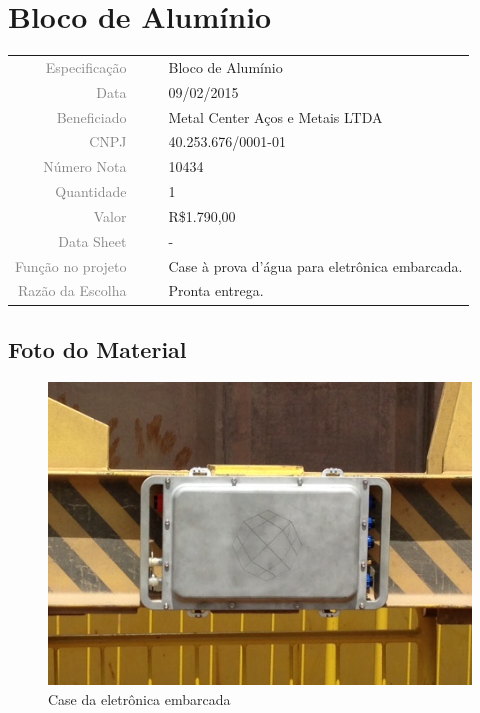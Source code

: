 \section{Bloco de Alumínio}
\label{aluminio_01}


\begin{table}[ht!]

	\begin{tabular}{r l|l p{12cm} }
		
		\textcolor{gray}{Especificação} &&& 	{Bloco de Alumínio}\\
		\textcolor{gray}{Data} &&& 				{09/02/2015}\\
        \textcolor{gray}{Beneficiado} &&&		{Metal Center Aços e Metais LTDA}\\
        \textcolor{gray}{CNPJ} &&& 				{40.253.676/0001-01}\\
        \textcolor{gray}{Número Nota} &&& 		{10434}\\
		\textcolor{gray}{Quantidade} &&& 		{1}\\
		\textcolor{gray}{Valor} &&& 			{R\$1.790,00}\\
		\textcolor{gray}{Data Sheet} &&& 		{-}\\

		\textcolor{gray}{Função no projeto} &&& {Case à prova d'água para eletrônica
		embarcada.}\\
		\textcolor{gray}{Razão da Escolha} &&& {Pronta entrega.}

	\end{tabular}
\end{table}

\newpage
\subsection{Foto do Material}
\begin{figure}[H]
 \centering
 \includegraphics[width=1\columnwidth]{Aluminio/foto.png}
 \caption{Case da eletrônica embarcada}
\end{figure}

